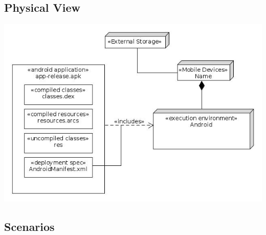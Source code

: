 \documentclass[12pt]{article}
\begin{document}
\subsection{Physical View}
\includegraphics[width=140mm]{./Deployment.jpg}
\subsection{Scenarios}
\end{document}
